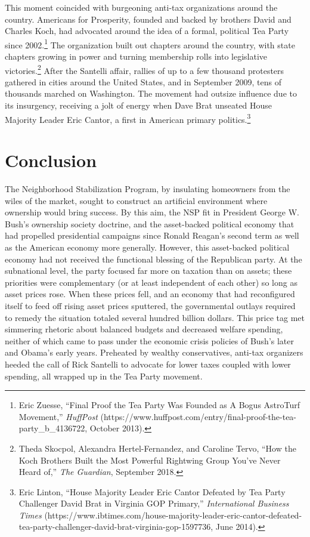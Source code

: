\documentclass[12pt,oneside]{psthesis}
\begin{document}
This moment coincided with burgeoning anti-tax organizations around the country.
Americans for Prosperity, founded and backed by brothers David and Charles Koch, had advocated around the idea of a formal, political Tea Party since 2002.\footnote{Eric Zuesse, ``Final Proof the Tea Party Was Founded as A Bogus AstroTurf Movement,'' \emph{HuffPost} (https://www.huffpost.com/entry/final-proof-the-tea-party\_b\_4136722, October 2013).}
The organization built out chapters around the country, with state chapters growing in power and turning membership rolls into legislative victories.\footnote{Theda Skocpol, Alexandra Hertel-Fernandez, and Caroline Tervo, ``How the Koch Brothers Built the Most Powerful Rightwing Group You've Never Heard of,'' \emph{The Guardian}, September 2018.}
After the Santelli affair, rallies of up to a few thousand protesters gathered in cities around the United States, and in September 2009, tens of thousands marched on Washington.
The movement had outsize influence due to its insurgency, receiving a jolt of energy when Dave Brat unseated House Majority Leader Eric Cantor, a first in American primary politics.\footnote{Eric Linton, ``House Majority Leader Eric Cantor Defeated by Tea Party Challenger David Brat in Virginia GOP Primary,'' \emph{International Business Times} (https://www.ibtimes.com/house-majority-leader-eric-cantor-defeated-tea-party-challenger-david-brat-virginia-gop-1597736, June 2014).}

\hypertarget{conclusion}{%
\section{Conclusion}\label{conclusion}}

The Neighborhood Stabilization Program, by insulating homeowners from the wiles of the market, sought to construct an artificial environment where ownership would bring success.
By this aim, the NSP fit in President George W. Bush's ownership society doctrine, and the asset-backed political economy that had propelled presidential campaigns since Ronald Reagan's second term as well as the American economy more generally.
However, this asset-backed political economy had not received the functional blessing of the Republican party. At the subnational level, the party focused far more on taxation than on assets; these priorities were complementary (or at least independent of each other) so long as asset prices rose.
When these prices fell, and an economy that had reconfigured itself to feed off rising asset prices sputtered, the governmental outlays required to remedy the situation totaled several hundred billion dollars.
This price tag met simmering rhetoric about balanced budgets and decreased welfare spending, neither of which came to pass under the economic crisis policies of Bush's later and Obama's early years.
Preheated by wealthy conservatives, anti-tax organizers heeded the call of Rick Santelli to advocate for lower taxes coupled with lower spending, all wrapped up in the Tea Party movement.
\end{document}
